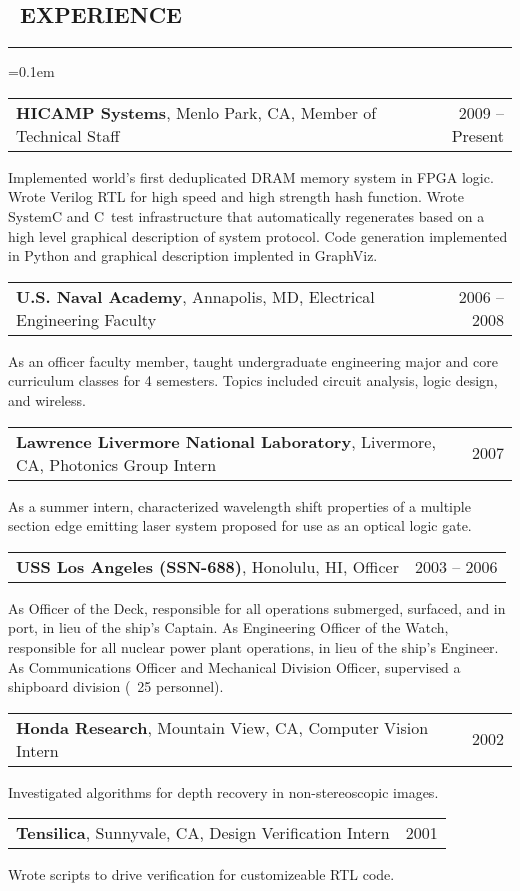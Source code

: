 \documentclass[10pt,letterpaper]{article}
\makeatletter
\newenvironment{changemargin}[2]
{%
    \begin{list}{}{%
        \setlength{\topsep}{0pt}%
        \setlength{\leftmargin}{#1}%
        \setlength{\rightmargin}{#2}%
        \setlength{\listparindent}{\parindent}%
        \setlength{\itemindent}{\parindent}%
        \setlength{\parsep}{\parskip}%
    }%
    \item[]
}%
{%
    \end{list}
}%
\newenvironment{content}
{%
    \begin{changemargin}{0cm}{2.5cm}
    \begin{itemize*}
        \vspace{-0.15em}
}%
{%
    \end{itemize*}
    \end{changemargin}
}%
\newenvironment{resumesection}[1]
{%
    \subsection*{\ #1}
    \vspace{-0.4em}
    \hrule
    \vspace{+0.4em}
    \begin{itemize}
        \parskip=0.1em
}%
{%
    \end{itemize}
}%
\newcommand{\headerrowx}[2]
{\item[] \begin{tabular*}{\linewidth}{l@{\extracolsep{\fill}}r}
	#1 &
	#2 \\
\end{tabular*}}
\newcommand{\CPP}
{C\nolinebreak[4]\hspace{-.05em}\raisebox{.22ex}{\footnotesize\bf +\hspace{-.20em}+}\ }
\makeatother
\begin{document}
\begin{resumesection}{EXPERIENCE}
    \headerrowx{ \textbf{HICAMP Systems}, Menlo Park, CA, Member of Technical Staff} {2009 -- Present}
    \begin{content}
        \item[] Implemented world's first deduplicated DRAM memory system in FPGA logic.
                Wrote Verilog RTL for high speed and high strength hash function.
                Wrote SystemC and \CPP test infrastructure that automatically regenerates based on a high level graphical description of system protocol.
                Code generation implemented in Python and graphical description implented in GraphViz.
    \end{content}
    \headerrowx{ \textbf{U.S. Naval Academy}, Annapolis, MD, Electrical Engineering Faculty} {2006 -- 2008}
    \begin{content}
        \item[] As an officer faculty member, taught undergraduate engineering major and core curriculum classes for 4 semesters.
                Topics included circuit analysis, logic design, and wireless.
    \end{content}
    \headerrowx{ \textbf{Lawrence Livermore National Laboratory}, Livermore, CA, Photonics Group Intern} {2007}
    \begin{content}
        \item[] As a summer intern, characterized wavelength shift properties of a multiple section edge emitting laser system proposed for use as an optical logic gate.
    \end{content}
    \headerrowx{ \textbf{USS Los Angeles (SSN-688)}, Honolulu, HI, Officer} {2003 -- 2006}
    \begin{content}
        \item[] As Officer of the Deck, responsible for all operations submerged, surfaced, and in port, in lieu of the ship's Captain.
                As Engineering Officer of the Watch, responsible for all nuclear power plant operations, in lieu of the ship's Engineer.
                As Communications Officer and Mechanical Division Officer, supervised a shipboard division (~25 personnel).
    \end{content}
    \headerrowx{ \textbf{Honda Research}, Mountain View, CA, Computer Vision Intern} {2002}
    \begin{content}
        \item[] Investigated algorithms for depth recovery in non-stereoscopic images.
    \end{content}
    \headerrowx{ \textbf{Tensilica}, Sunnyvale, CA, Design Verification Intern} {2001}
    \begin{content}
        \item[] Wrote scripts to drive verification for customizeable RTL code.
    \end{content}
\end{resumesection}
\end{document}
